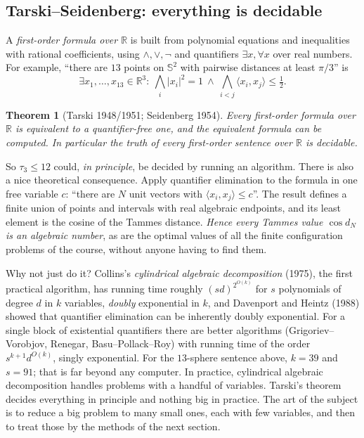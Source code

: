 \documentclass[11pt,openany]{book}
\theoremstyle{plain}
\newtheorem{theorem}{Theorem}[chapter]
\theoremstyle{definition}
\theoremstyle{remark}
\newcommand{\R}{\mathbb{R}}
\newcommand{\Sph}{\mathbb{S}}          %
\newcommand{\abs}[1]{\left\lvert #1 \right\rvert}
\newcommand{\ip}[2]{\langle #1, #2\rangle}
\newcommand{\kiss}{\tau}               %
\begin{document}
\subsection{Tarski--Seidenberg: everything is decidable}
A \emph{first-order formula over $\R$} is built from polynomial equations and inequalities with rational
coefficients, using $\wedge,\vee,\neg$ and quantifiers $\exists x,\forall x$ over real numbers. For example,
``there are $13$ points on $\Sph^2$ with pairwise distances at least $\pi/3$'' is
\[
  \exists x_1,\dots,x_{13}\in\R^3:\ \bigwedge_i\abs{x_i}^2=1\ \wedge\ \bigwedge_{i<j}\ip{x_i}{x_j}\le\tfrac12 .
\]

\begin{theorem}[Tarski 1948/1951; Seidenberg 1954]
Every first-order formula over $\R$ is equivalent to a quantifier-free one, and the equivalent formula can
be computed. In particular the truth of every first-order sentence over $\R$ is decidable.
\end{theorem}

So $\kiss_3\le12$ could, \emph{in principle}, be decided by running an algorithm. There is also a
nice theoretical consequence. Apply quantifier elimination to the formula in one free variable
$c$: ``there are $N$ unit vectors with $\ip{x_i}{x_j}\le c$''. The result defines a finite union of
points and intervals with real algebraic endpoints, and its least element is the cosine of the Tammes
distance. \emph{Hence every Tammes value $\cos d_N$ is an algebraic number}, as are the optimal
values of all the finite configuration problems of the course, without anyone having to find them.

Why not just do it? Collins's \emph{cylindrical algebraic decomposition} (1975), the first practical
algorithm, has running time roughly $(sd)^{2^{O(k)}}$ for $s$ polynomials of degree $d$ in $k$ variables,
\emph{doubly} exponential in $k$, and Davenport and Heintz (1988) showed that quantifier elimination
can be inherently doubly exponential. For a single block of existential quantifiers there are better
algorithms (Grigoriev--Vorobjov, Renegar, Basu--Pollack--Roy) with running time of the order
$s^{k+1}d^{O(k)}$, singly exponential. For the $13$-sphere sentence above, $k=39$ and $s=91$; that is far
beyond any computer. In practice, cylindrical algebraic decomposition handles problems with a handful of
variables. Tarski's theorem decides everything in principle and nothing big in practice. The art of
the subject is to reduce a big problem to many small ones, each with few variables, and then to treat
those by the methods of the next section.
\end{document}

